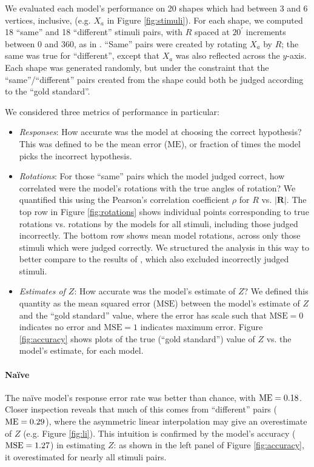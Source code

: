 \documentclass{article} %
\newcommand{\MSE}[0]{\mathrm{MSE}}
\newcommand{\ME}[0]{\mathrm{ME}}
\newcommand{\naive}[0]{na\"ive}
\newcommand{\Naive}[0]{Na\"ive}
\begin{document}
We evaluated each model's performance on 20 shapes which had between 3
and 6 vertices, inclusive, (e.g. $X_a$ in Figure
\ref{fig:stimuli}). For each shape, we computed 18 ``same'' and 18
``different'' stimuli pairs, with $R$ spaced at $20^\prime$ increments
between 0 and 360, as in \cite{Shepard1971}. ``Same'' pairs were
created by rotating $X_a$ by $R$; the same was true for ``different'',
except that $X_a$ was also reflected across the $y$-axis. Each shape
was generated randomly, but under the constraint that the
``same''/``different'' pairs created from the shape could both be
judged according to the ``gold standard''.

We considered three metrics of performance in particular:
\begin{itemize}
\item \textit{Responses}: How accurate was the model at choosing the
  correct hypothesis? This was defined to be the mean error ($\ME{}$),
  or fraction of times the model picks the incorrect hypothesis.
\item \textit{Rotations}: For those ``same'' pairs which the model
  judged correct, how correlated were the model's rotations with the
  true angles of rotation?  We quantified this using the Pearson's
  correlation coefficient $\rho$ for $R$ vs. $\vert
  \mathbf{R}\vert$. The top row in Figure \ref{fig:rotations} shows
  individual points corresponding to true rotations vs. rotations by
  the models for all stimuli, including those judged incorrectly. The
  bottom row shows mean model rotations, across only those stimuli
  which were judged correctly. We structured the analysis in this way
  to better compare to the results of \cite{Shepard1971}, which also
  excluded incorrectly judged stimuli.
\item \textit{Estimates of $Z$}: How accurate was the model's estimate
  of $Z$? We defined this quantity as the mean squared error
  ($\MSE{}$) between the model's estimate of $Z$ and the ``gold
  standard'' value, where the error has scale such that $\MSE{}=0$
  indicates no error and $\MSE{}=1$ indicates maximum error. Figure
  \ref{fig:accuracy} shows plots of the true (``gold standard'') value
  of $Z$ vs. the model's estimate, for each model.
\end{itemize}

\paragraph{\Naive{}} 

The \naive{} model's response error rate was better than chance, with
$\NaiveME{}$. Closer inspection reveals that much of this comes from
``different'' pairs ($\NaiveMEdiff{}$), where the asymmetric linear
interpolation may give an overestimate of $Z$ (e.g. Figure
\ref{fig:li}).  This intuition is confirmed by the model's accuracy
($\NaiveMSE{}$) in estimating $Z$: as shown in the left panel of
Figure \ref{fig:accuracy}, it overestimated for nearly all stimuli
pairs.
\end{document}
